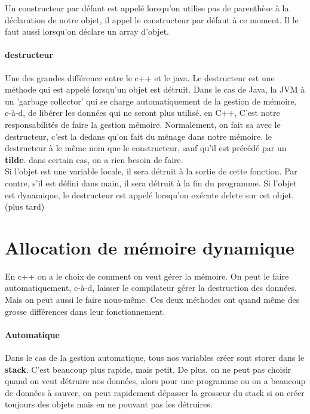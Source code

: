 \documentclass[oneside]{book}
\begin{document}
Un constructeur par défaut est appelé lorsqu'on utilise pas de parenthèse à la déclaration de notre objet, il appel le constructeur par défaut à ce moment. Il le faut aussi lorsqu'on déclare un array d'objet.
\paragraph{destructeur}
Une des grandes différence entre le c++ et le java. Le destructeur est une méthode qui est appelé lorsqu'un objet est détruit. Dans le cas de Java, la JVM à un 'garbage collector' qui se charge automatiquement de la gestion de mémoire, c-à-d, de libérer les données qui ne seront plus utilisé. en C++, C'est notre responsabilités de faire la gestion mémoire. Normalement, on fait sa avec le destructeur, c'est la dedans qu'on fait du ménage dans notre mémoire. le destructeur à le même nom que le constructeur, sauf qu'il est précédé par un \textbf{tilde}. dans certain cas, on a rien besoin de faire.\\

Si l'objet est une variable locale, il sera détruit à la sortie de cette fonction. Par contre, s'il est défini dans main, il sera détruit à la fin du programme. Si l'objet est dynamique, le destructeur est appelé lorsqu'on exécute delete sur cet objet. (plus tard)\\

\section{Allocation de mémoire dynamique}
En c++ on a le choix de comment on veut gérer la mémoire. On peut le faire automatiquement, c-à-d, laisser le compilateur gérer la destruction des données. Mais on peut aussi le faire nous-même. Ces deux méthodes ont quand même des grosse différences dans leur fonctionnement.\\

\paragraph{Automatique}
Dans le cas de la gestion automatique, tous nos variables créer sont storer dans le \textbf{stack}. C'est beaucoup plus rapide, mais petit. De plus, on ne peut pas choisir quand on veut détruire nos données, alors pour une programme ou on a beaucoup de données à sauver, on peut rapidement dépasser la grosseur du stack si on créer toujours des objets mais en ne pouvant pas les détruires.\\
\end{document}
